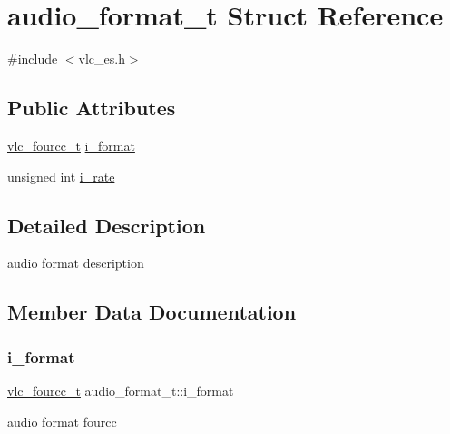 \hypertarget{structaudio__format__t}{}\section{audio\+\_\+format\+\_\+t Struct Reference}
\label{structaudio__format__t}


{\ttfamily \#include $<$vlc\+\_\+es.\+h$>$}

\subsection*{Public Attributes}
\begin{DoxyCompactItemize}
\item 
\hyperlink{vlc__common_8h_af49f89d0f752bc9cff142e43b1bd634d}{vlc\+\_\+fourcc\+\_\+t} \hyperlink{structaudio__format__t_ae485e90fd739d7db5c764e5fedfa4ca4}{i\+\_\+format}
\item 
unsigned int \hyperlink{structaudio__format__t_a3197dc87e3081eb425a3070317ad7e98}{i\+\_\+rate}
\end{DoxyCompactItemize}


\subsection{Detailed Description}
audio format description 

\subsection{Member Data Documentation}
\mbox{\label{structaudio__format__t_ae485e90fd739d7db5c764e5fedfa4ca4}} 
\subsubsection{\texorpdfstring{i\+\_\+format}{i\_format}}
{\footnotesize\ttfamily \hyperlink{vlc__common_8h_af49f89d0f752bc9cff142e43b1bd634d}{vlc\+\_\+fourcc\+\_\+t} audio\+\_\+format\+\_\+t\+::i\+\_\+format}

audio format fourcc \mbox{\label{structaudio__format__t_a3197dc87e3081eb425a3070317ad7e98}} 
